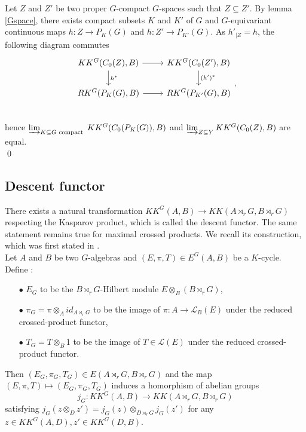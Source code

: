 \begin{dem}
Let $Z$ and $Z'$ be two proper $G$-compact $G$-spaces such that $Z\subseteq Z'$. By lemma \ref{Gspace}, there exists compact subsets $K$ and $K'$ of $G$ and $G$-equivariant continuous maps $h : Z\rightarrow P_K(G)$ and $h : Z'\rightarrow P_{K'}(G)$. As $h'_{|Z} = h $, the following diagram commutes
\[\begin{tikzcd}
KK^G(C_0(Z),B)\arrow{r}\arrow{d}{h^*} & KK^G(C_0(Z'),B)\arrow{d}{(h')^*} \\
RK^G(P_{K}(G),B)\arrow{r} & RK^G(P_{K'}(G),B) \\
\end{tikzcd},\]
hence $\varinjlim_{K\subseteq G \text{ compact }} KK^G(C_0(P_K(G)),B)$ and $\varinjlim_{Z\subseteq Y} KK^G(C_0(Z),B)$ are equal.\\
\qed
\end{dem}

\subsection{Descent functor}

There exists a natural transformation $KK^G(A,B)\rightarrow KK(A\rtimes_r G, B\rtimes_r G)$ respecting the Kasparov product, which is called the descent functor. The same statement remains true for maximal crossed products. We recall its construction, which was first stated in \cite{LeGall}.\\
 
Let $A$ and $B$ be two $G$-algebras and $(E,\pi,T)\in E^G(A,B)$ be a $K$-cycle. Define :
\begin{itemize}
\item[$\bullet$] $E_G$ to be the $B\rtimes_r G$-Hilbert module $E\otimes_B (B\rtimes_r G)$,
\item[$\bullet$] $\pi_G = \pi\otimes_{A}id_{A\rtimes_r G} $ to be the image of $\pi:A \rightarrow \mathcal L_B(E)$ under the reduced crossed-product functor,
\item[$\bullet$] $T_G = T\otimes_{B}1$ to be the image of $T\in\mathcal L(E)$ under the reduced crossed-product functor.
\end{itemize}
Then $(E_G,\pi_G,T_G)\in E(A\rtimes_r G,B\rtimes_r G)$ and the map $(E,\pi,T)\mapsto (E_G,\pi_G,T_G) $ induces a homorphism of abelian groups
\[j_G : KK^G(A,B)\rightarrow KK(A\rtimes_r G,B\rtimes_r G)\]
satisfying $j_G(z\otimes_D z')=j_G(z)\otimes_{D\rtimes_r G} j_G(z')$ for any $z\in KK^G(A,D), z'\in KK^G(D,B)$.\\ 


